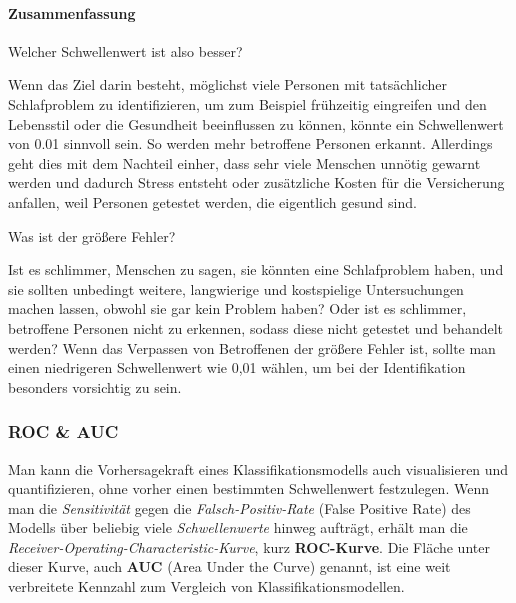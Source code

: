 \documentclass[
]{article}
\newenvironment{Shaded}{\begin{snugshade}}{\end{snugshade}}
\newcommand{\CommentTok}[1]{\textcolor[rgb]{0.56,0.35,0.01}{\textit{#1}}}
\newcommand{\FunctionTok}[1]{\textcolor[rgb]{0.13,0.29,0.53}{\textbf{#1}}}
\newcommand{\NormalTok}[1]{#1}
\newcommand{\OtherTok}[1]{\textcolor[rgb]{0.56,0.35,0.01}{#1}}
\newcommand{\SpecialCharTok}[1]{\textcolor[rgb]{0.81,0.36,0.00}{\textbf{#1}}}
\begin{document}
\paragraph{Zusammenfassung}\label{zusammenfassung-1}

Welcher Schwellenwert ist also besser?

Wenn das Ziel darin besteht, möglichst viele Personen mit tatsächlicher Schlafproblem zu identifizieren, um zum Beispiel frühzeitig eingreifen und den Lebensstil oder die Gesundheit beeinflussen zu können, könnte ein Schwellenwert von 0.01 sinnvoll sein. So werden mehr betroffene Personen erkannt. Allerdings geht dies mit dem Nachteil einher, dass sehr viele Menschen unnötig gewarnt werden und dadurch Stress entsteht oder zusätzliche Kosten für die Versicherung anfallen, weil Personen getestet werden, die eigentlich gesund sind.

Was ist der größere Fehler?

Ist es schlimmer, Menschen zu sagen, sie könnten eine Schlafproblem haben, und sie sollten unbedingt weitere, langwierige und kostspielige Untersuchungen machen lassen, obwohl sie gar kein Problem haben? Oder ist es schlimmer, betroffene Personen nicht zu erkennen, sodass diese nicht getestet und behandelt werden? Wenn das Verpassen von Betroffenen der größere Fehler ist, sollte man einen niedrigeren Schwellenwert wie 0,01 wählen, um bei der Identifikation besonders vorsichtig zu sein.

\subsubsection{ROC \& AUC}\label{roc-auc}

Man kann die Vorhersagekraft eines Klassifikationsmodells auch visualisieren und quantifizieren, ohne vorher einen bestimmten Schwellenwert festzulegen. Wenn man die \emph{Sensitivität} gegen die \emph{Falsch-Positiv-Rate} (False Positive Rate) des Modells über beliebig viele \emph{Schwellenwerte} hinweg aufträgt, erhält man die \emph{Receiver-Operating-Characteristic-Kurve}, kurz \textbf{ROC-Kurve}. Die Fläche unter dieser Kurve, auch \textbf{AUC} (Area Under the Curve) genannt, ist eine weit verbreitete Kennzahl zum Vergleich von Klassifikationsmodellen.

\begin{Shaded}
\end{Shaded}
\end{document}
